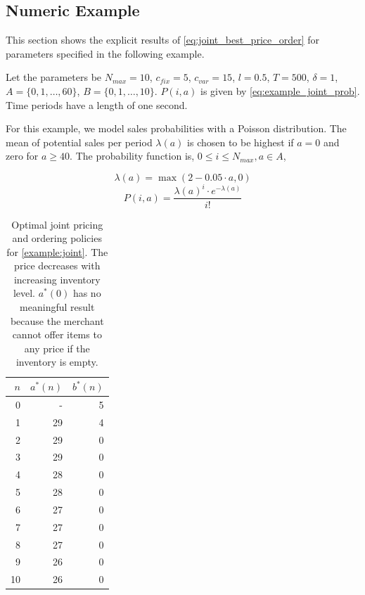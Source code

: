 
\subsection{Numeric Example}
\label{section:joint_example}
This section shows the explicit results of \cref{eq:joint_best_price_order} for parameters specified in the following example.

\begin{example}
Let the parameters be $N_{max} = 10$, $c_{fix} = 5$, $c_{var} = 15$, $l = 0.5$,
$T = 500$, $\delta = 1$, $A = \{0, 1, \ldots, 60\}$, $B = \{0, 1, \ldots, 10\}$.
$P(i, a)$ is given by \cref{eq:example_joint_prob}.
Time periods have a length of one second.
\label{example:joint}
\end{example}

For this example, we model sales probabilities with a Poisson distribution.
The mean of potential sales per period $\lambda(a)$ is chosen to be highest if $a = 0$ and zero for $a \geq 40$.
The probability function is, $0 \leq i \leq N_{max}, a \in A$,

\begin{equation}
\lambda(a) = \max(2 - 0.05 \cdot a, 0)
\end{equation}
\begin{equation}
P(i, a) = \frac{\lambda(a)^i \cdot e^{-\lambda(a)}}{i!}
\label{eq:example_joint_prob}
\end{equation}

\begin{table}[t]
	\centering
	\begin{tabular}{rrr}
		\toprule
		$n$ & $a^*(n)$ & $b^*(n)$ \\
		\midrule
		0 & - & 5 \\
		1 & 29 & 4 \\
		2 & 29 & 0 \\
		3 & 29 & 0\\
		4 & 28 & 0\\
		5 & 28 & 0\\
		6 & 27 & 0\\
		7 & 27 & 0\\
		8 & 27 & 0\\
		9 & 26 & 0\\
		10 & 26 & 0\\
		\bottomrule
	\end{tabular}
\caption[Numerical Example: Joint Pricing and Ordering Policy]{
Optimal joint pricing and ordering policies for \cref{example:joint}.
The price decreases with increasing inventory level.
$a^*(0)$ has no meaningful result because the merchant cannot offer items to any price if the inventory is empty.
}
\label{tab:example_joint}
\end{table}


